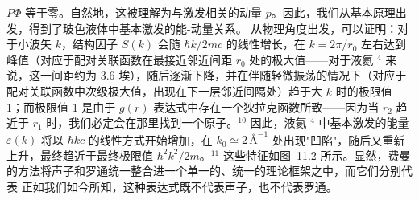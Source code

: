 \(P\Phi\) 等于零。自然地，这被理解为与激发相关的动量 \(p\)。因此，我们从基本原理出发，得到了玻色液体中基本激发的能-动量关系。
从物理角度出发，可以证明：对于小波矢 \(k\)，结构因子 \(S(k)\) 会随 \(\hbar k/2mc\) 的线性增长，在 \(k=2\pi/r_0\) 左右达到峰值（对应于配对关联函数在最接近邻近间距 \(r_0\) 处的极大值——对于液氦 \(^4\) 来说，这一间距约为 3.6 埃），随后逐渐下降，并在伴随轻微振荡的情况下（对应于配对关联函数中次级极大值，出现在下一层邻近间隔处）趋于大 \(k\) 时的极限值 1；而极限值 1 是由于 \(g(r)\) 表达式中存在一个狄拉克函数所致——因为当 \(r_2\) 趋近于 \(r_1\) 时，我们必定会在那里找到一个原子。\(^{10}\) 因此，液氦 \(^4\) 中基本激发的能量 \(\varepsilon(k)\) 将以 \(\hbar kc\) 的线性方式开始增加，在 \(k_0 \simeq 2 \, \text{Å}^{-1}\) 处出现"凹陷"，随后又重新上升，最终趋近于最终极限值 \(\hbar^2k^2/2m\)。\(^{11}\) 这些特征如图~11.2 所示。显然，费曼的方法将声子和罗通统一整合进一个单一的、统一的理论框架之中，而它们分别代表
正如我们如今所知，这种表达式既不代表声子，也不代表罗通。

